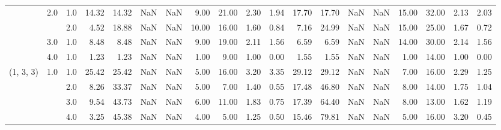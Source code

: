 \begin{tabular}{lllrrrrrrrrrrrrrrrr}
          & 2.0 & 1.0  &     14.32 &      14.32 &               NaN &                NaN &  9.00 &  21.00 &             2.30 &                         1.94 &     17.70 &      17.70 &               NaN &                NaN & 15.00 &  32.00 &             2.13 &                         2.03 \\
          &     & 2.0  &      4.52 &      18.88 &               NaN &                NaN & 10.00 &  16.00 &             1.60 &                         0.84 &      7.16 &      24.99 &               NaN &                NaN & 15.00 &  25.00 &             1.67 &                         0.72 \\
          & 3.0 & 1.0  &      8.48 &       8.48 &               NaN &                NaN &  9.00 &  19.00 &             2.11 &                         1.56 &      6.59 &       6.59 &               NaN &                NaN & 14.00 &  30.00 &             2.14 &                         1.56 \\
          & 4.0 & 1.0  &      1.23 &       1.23 &               NaN &                NaN &  1.00 &   9.00 &             1.00 &                         0.00 &      1.55 &       1.55 &               NaN &                NaN &  1.00 &  14.00 &             1.00 &                         0.00 \\
(1, 3, 3) & 1.0 & 1.0  &     25.42 &      25.42 &               NaN &                NaN &  5.00 &  16.00 &             3.20 &                         3.35 &     29.12 &      29.12 &               NaN &                NaN &  7.00 &  16.00 &             2.29 &                         1.25 \\
          &     & 2.0  &      8.26 &      33.37 &               NaN &                NaN &  5.00 &   7.00 &             1.40 &                         0.55 &     17.48 &      46.80 &               NaN &                NaN &  8.00 &  14.00 &             1.75 &                         1.04 \\
          &     & 3.0  &      9.54 &      43.73 &               NaN &                NaN &  6.00 &  11.00 &             1.83 &                         0.75 &     17.39 &      64.40 &               NaN &                NaN &  8.00 &  13.00 &             1.62 &                         1.19 \\
          &     & 4.0  &      3.25 &      45.38 &               NaN &                NaN &  4.00 &   5.00 &             1.25 &                         0.50 &     15.46 &      79.81 &               NaN &                NaN &  5.00 &  16.00 &             3.20 &                         0.45 \\

\end{tabular}
